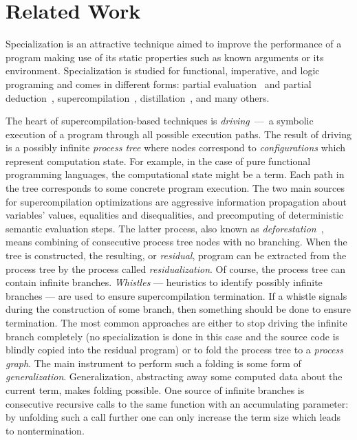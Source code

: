 \section{Related Work}

Specialization is an attractive technique aimed to improve the performance of a program making use of its static properties such as known arguments or its environment.
Specialization is studied for functional, imperative, and logic programing and comes in different forms: partial evaluation~\cite{jonesbook} and partial deduction~\cite{lloyd1991partial}, supercompilation~\cite{soerensen1996positive}, distillation~\cite{hamilton2007distillation}, and many others.


The heart of supercompilation-based techniques is \emph{driving}~---~a symbolic execution of a program through all possible execution paths.
The result of driving is a possibly infinite \emph{process tree} where nodes correspond to \emph{configurations} which represent computation state.
For example, in the case of pure functional programming languages, the computational state might be a term.
Each path in the tree corresponds to some concrete program execution.
The two main sources for supercompilation optimizations are aggressive information propagation about variables' values, equalities and disequalities, and precomputing of deterministic semantic evaluation steps.
The latter process, also known as \emph{deforestation}~\cite{deforestation}, means  combining of consecutive process tree nodes with no branching.
When the tree is constructed, the resulting, or \emph{residual}, program can be extracted from the process tree by the process called \emph{residualization}.
Of course, the process tree can contain infinite branches.
\emph{Whistles} --- heuristics to identify possibly infinite branches --- are used to ensure supercompilation termination.
If a whistle signals during the construction of some branch, then something should be done to ensure termination.
The most common approaches are either to stop driving the infinite branch completely (no specialization is done in this case and the source code is blindly copied into the residual program) or to fold the process tree to a \emph{process graph}.
The main instrument to perform such a folding is some form of \emph{generalization}.
Generalization, abstracting away some computed data about the current term, makes folding possible.
One source of infinite branches is consecutive recursive calls to the same function with an accumulating parameter: by unfolding such a call further one can only increase the term size which leads to nontermination.
